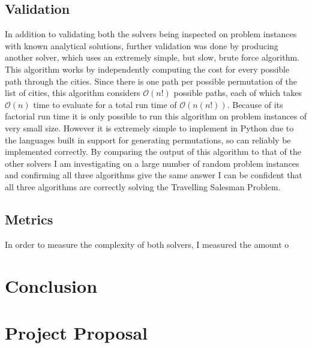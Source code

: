 \documentclass[12pt,a4paper,twoside,openright]{report}
\begin{document}
\section{Validation}
In addition to validating both the solvers being inspected on problem instances with known analytical solutions, further validation was done by producing another solver, which uses an extremely simple, but slow, brute force algorithm. This algorithm works by independently computing the cost for every possible path through the cities. Since there is one path per possible permutation of the list of cities, this algorithm considers $\mathcal{O}(n!)$ possible paths, each of which takes $\mathcal{O}(n)$ time to evaluate for a total run time of $\mathcal{O}(n(n!))$. Because of its factorial run time it is only possible to run this algorithm on problem instances of very small size. However it is extremely simple to implement in Python due to the languages built in support for generating permutations, so can reliably be implemented correctly. By comparing the output of this algorithm to that of the other solvers I am investigating on a large number of random problem instances and confirming all three algorithms give the same answer I can be confident that all three algorithms are correctly solving the Travelling Salesman Problem.

\section{Metrics}
In order to measure the complexity of both solvers, I measured the amount o

\chapter{Conclusion}



\appendix

\chapter{Project Proposal}


\end{document}
